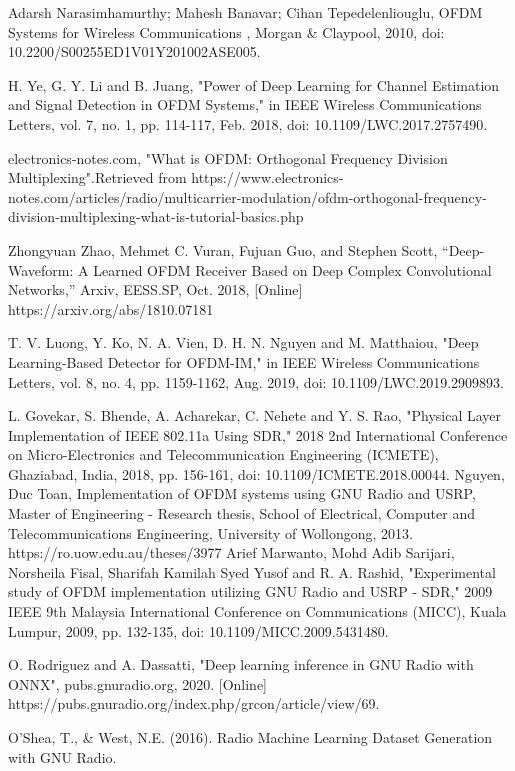 \documentclass[conference]{IEEEtran}
\begin{document}
\begin{thebibliography}{00}

Adarsh Narasimhamurthy; Mahesh Banavar; Cihan Tepedelenliouglu, OFDM Systems for Wireless Communications , Morgan \& Claypool, 2010, doi: 10.2200/S00255ED1V01Y201002ASE005.

H. Ye, G. Y. Li and B. Juang, "Power of Deep Learning for Channel Estimation and Signal Detection in OFDM Systems," in IEEE Wireless Communications Letters, vol. 7, no. 1, pp. 114-117, Feb. 2018, doi: 10.1109/LWC.2017.2757490.

electronics-notes.com, "What is OFDM: Orthogonal Frequency Division Multiplexing".Retrieved from https://www.electronics-notes.com/articles/radio/multicarrier-modulation/ofdm-orthogonal-frequency-division-multiplexing-what-is-tutorial-basics.php

 Zhongyuan Zhao, Mehmet C. Vuran, Fujuan Guo, and Stephen Scott, “Deep-Waveform: A Learned OFDM Receiver Based on Deep Complex Convolutional Networks,” Arxiv, EESS.SP, Oct. 2018, [Online] https://arxiv.org/abs/1810.07181

T. V. Luong, Y. Ko, N. A. Vien, D. H. N. Nguyen and M. Matthaiou, "Deep Learning-Based Detector for OFDM-IM," in IEEE Wireless Communications Letters, vol. 8, no. 4, pp. 1159-1162, Aug. 2019, doi: 10.1109/LWC.2019.2909893.

L. Govekar, S. Bhende, A. Acharekar, C. Nehete and Y. S. Rao, "Physical Layer Implementation of IEEE 802.11a Using SDR," 2018 2nd International Conference on Micro-Electronics and Telecommunication Engineering (ICMETE), Ghaziabad, India, 2018, pp. 156-161, doi: 10.1109/ICMETE.2018.00044.
 Nguyen, Duc Toan, Implementation of OFDM systems using GNU Radio and USRP, Master of Engineering - Research thesis, School of Electrical, Computer and Telecommunications Engineering, University of Wollongong, 2013. https://ro.uow.edu.au/theses/3977
 Arief Marwanto, Mohd Adib Sarijari, Norsheila Fisal, Sharifah Kamilah Syed Yusof and R. A. Rashid, "Experimental study of OFDM implementation utilizing GNU Radio and USRP - SDR," 2009 IEEE 9th Malaysia International Conference on Communications (MICC), Kuala Lumpur, 2009, pp. 132-135, doi: 10.1109/MICC.2009.5431480.

O. Rodriguez and A. Dassatti, "Deep learning inference in GNU Radio with ONNX", pubs.gnuradio.org, 2020. [Online] https://pubs.gnuradio.org/index.php/grcon/article/view/69.

 O'Shea, T., \& West, N.E. (2016). Radio Machine Learning Dataset Generation with GNU Radio.

\end{thebibliography}
\end{document}

